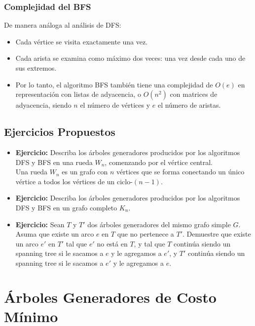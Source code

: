 \subsubsection*{Complejidad del BFS}

De manera análoga al análisis de DFS:

\begin{itemize}
  \item Cada vértice se visita exactamente una vez.
  \item Cada arista se examina como máximo dos veces: una vez desde cada uno de sus extremos.
  \item Por lo tanto, el algoritmo BFS también tiene una complejidad de $O(e)$ en representación con listas de adyacencia, o $O(n^2)$ con matrices de adyacencia, siendo $n$ el número de vértices y $e$ el número de aristas.
\end{itemize}


\subsection{Ejercicios Propuestos}

\begin{itemize}
  \item \textbf{Ejercicio:} Describa los árboles generadores producidos por los algoritmos DFS y BFS en una rueda $W_n$, comenzando por el vértice central.\\
  Una rueda $W_n$ es un grafo con $n$ vértices que se forma conectando un único vértice a todos los vértices de un ciclo-$(n-1)$.

  \item \textbf{Ejercicio:} Describa los árboles generadores producidos por los algoritmos DFS y BFS en un grafo completo $K_n$.

  \item \textbf{Ejercicio:} Sean $T$ y $T'$ dos árboles generadores del mismo grafo simple $G$. Asuma que existe un arco $e$ en $T$ que no pertenece a $T'$. Demuestre que existe un arco $e'$ en $T'$ tal que $e'$ no está en $T$, y tal que $T$ continúa siendo un spanning tree si le sacamos a $e$ y le agregamos a $e'$, y $T'$ continúa siendo un spanning tree si le sacamos a $e'$ y le agregamos a $e$.
\end{itemize}


\section{Árboles Generadores de Costo Mínimo}

